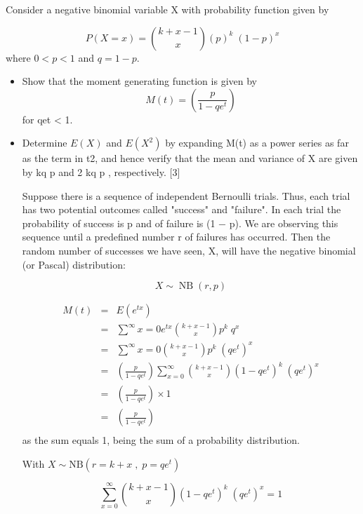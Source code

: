 \documentclass[a4paper,12pt]{article}
\begin{document}
\begin{enumerate}
 Consider a negative binomial variable X with probability function given by

\[P(X=x) =  { k+x-1 \choose x} (p) ^k \; (1-p) ^x \]
where $0 < p < 1$ and $q = 1 - p$.
\begin{itemize}
\item Show that the moment generating function is given by
\[ M ( t ) =  \left( \frac{p}{1-qe^t}\right)\]
for qet < 1. 
\item Determine $E(X)$ and $E(X^2)$ by expanding M(t) as a power series as far as the
term in t2, and hence verify that the mean and variance of X are given by
kq
p
and 2
kq
p
, respectively. [3]



\begin{framed}
Suppose there is a sequence of independent Bernoulli trials. Thus, each trial has two potential outcomes called "success" and "failure". 
In each trial the probability of success is p and of failure is (1 − p). We are observing this sequence until a predefined number r of failures has occurred. 
Then the random number of successes we have seen, X, will have the negative binomial (or Pascal) distribution:

\[{\displaystyle X\sim \operatorname {NB} (r,p)}\]
\end{framed}   
\begin{eqnarray*}
M ( t ) &=& E ( e^{tx} ) \\
&=& \sum^{\infty}{x=0} e^{tx} { k+x-1 \choose x} p^k \; q^x \\
&=& \sum^{\infty}{x=0} { k+x-1 \choose x} p^k \; (qe^{t}) ^x \\
&=& \left( \frac{p}{1-qe^t}\right) \sum^{\infty}_{x=0} { k+x-1 \choose x} (1-qe^{t}) ^k \; (qe^{t}) ^x \\
&=& \left( \frac{p}{1-qe^t}\right) \times 1\\ 
&=& \left( \frac{p}{1-qe^t}\right) \\
\end{eqnarray*}
 as the sum equals 1, being the sum of a probability 
distribution.



\begin{framed}

With $X \sim \mbox{NB}( r =k+x\;,\;p= qe^{t} )$

\[ \sum^{\infty}_{x=0} { k+x-1 \choose x} (1-qe^{t})^k \; (qe^{t})^x  = 1 \]


\end{framed}
\end{itemize}
\end{enumerate}
\end{document}
